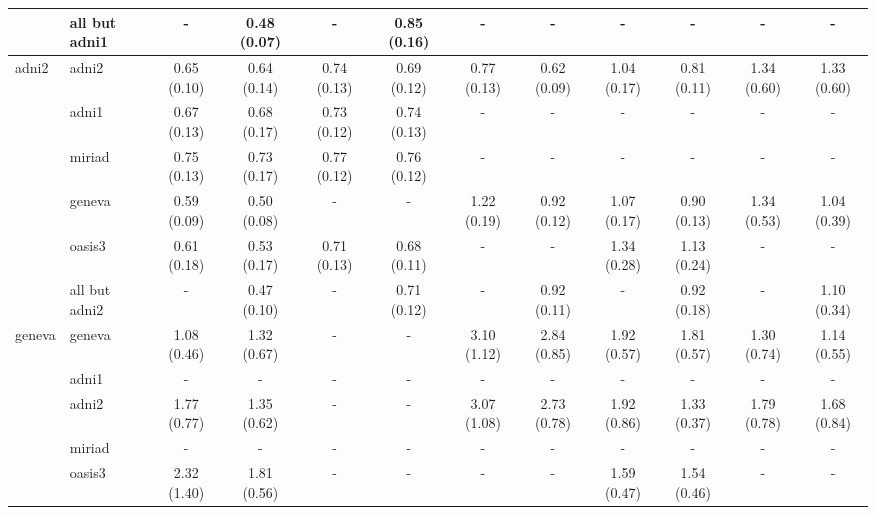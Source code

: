 \begin{table*}
{\begin{tabular}{llcccccccccc}
\cmidrule(lr){2-12}
       & all but adni1 &            - &  0.48 (0.07) &            - &  0.85 (0.16) &            - &            - &            - &            - &            - &            - \\
\midrule
adni2 & adni2 &  0.65 (0.10) &  0.64 (0.14) &  0.74 (0.13) &  0.69 (0.12) &  0.77 (0.13) &  0.62 (0.09) &  1.04 (0.17) &  0.81 (0.11) &  1.34 (0.60) &  1.33 (0.60) \\
\cmidrule(lr){2-12}
       & adni1 &  0.67 (0.13) &  0.68 (0.17) &  0.73 (0.12) &  0.74 (0.13) &            - &            - &            - &            - &            - &            - \\
       & miriad &  0.75 (0.13) &  0.73 (0.17) &  0.77 (0.12) &  0.76 (0.12) &            - &            - &            - &            - &            - &            - \\
       & geneva &  0.59 (0.09) &  0.50 (0.08) &            - &            - &  1.22 (0.19) &  0.92 (0.12) &  1.07 (0.17) &  0.90 (0.13) &  1.34 (0.53) &  1.04 (0.39) \\
       & oasis3 &  0.61 (0.18) &  0.53 (0.17) &  0.71 (0.13) &  0.68 (0.11) &            - &            - &  1.34 (0.28) &  1.13 (0.24) &            - &            - \\
\cmidrule(lr){2-12}
       & all but adni2 &            - &  0.47 (0.10) &            - &  0.71 (0.12) &            - &  0.92 (0.11) &            - &  0.92 (0.18) &            - &  1.10 (0.34) \\
\midrule
geneva & geneva &  1.08 (0.46) &  1.32 (0.67) &            - &            - &  3.10 (1.12) &  2.84 (0.85) &  1.92 (0.57) &  1.81 (0.57) &  1.30 (0.74) &  1.14 (0.55) \\
\cmidrule(lr){2-12}
       & adni1 &            - &            - &            - &            - &            - &            - &            - &            - &            - &            - \\
       & adni2 &  1.77 (0.77) &  1.35 (0.62) &            - &            - &  3.07 (1.08) &  2.73 (0.78) &  1.92 (0.86) &  1.33 (0.37) &  1.79 (0.78) &  1.68 (0.84) \\
       & miriad &            - &            - &            - &            - &            - &            - &            - &            - &            - &            - \\
       & oasis3 &  2.32 (1.40) &  1.81 (0.56) &            - &            - &            - &            - &  1.59 (0.47) &  1.54 (0.46) &            - &            - \\

\end{tabular}}
\end{table*}
